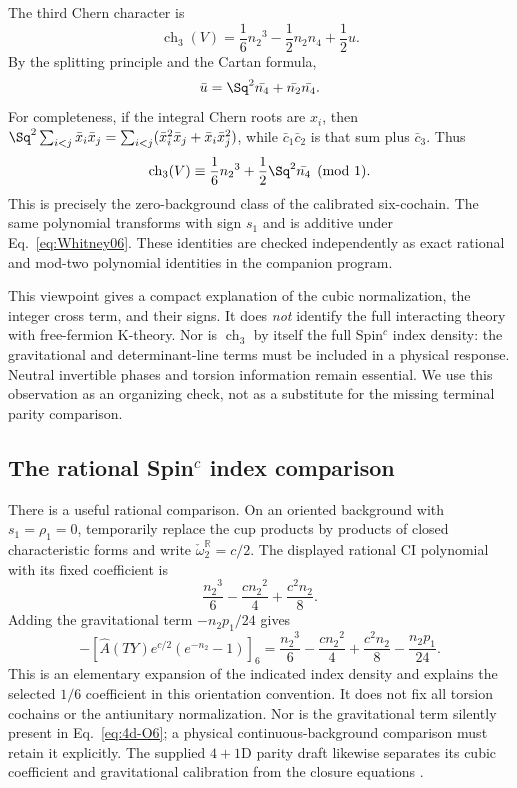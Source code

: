 The third Chern character is
\begin{equation}
               \operatorname{ch}_3(V)=\frac16{n_2}^3-\frac12{n_2}{n_4}+\frac12u.
\end{equation}
By the splitting principle and the Cartan formula,
\begin{equation}
                    \bar u=\Sq^2\bar {n_4}+\bar {n_2}\bar {n_4}.
\end{equation}
For completeness, if the integral Chern roots are $x_i$, then
$\Sq^2\sum_{i<j}\bar x_i\bar x_j=
\sum_{i<j}(\bar x_i^2\bar x_j+\bar x_i\bar x_j^2)$,
while $\bar c_1\bar c_2$ is that sum plus $\bar c_3$. Thus
\begin{equation}\label{eq:Newton06}
           \operatorname{ch}_3(V)
                  \equiv\frac16{n_2}^3+\frac12\Sq^2\bar {n_4}\pmod1.
\end{equation}
This is precisely the zero-background class of the calibrated six-cochain. The same polynomial transforms with sign ${s_1}$ and is additive under Eq.~\eqref{eq:Whitney06}. These identities are checked independently as exact rational and mod-two polynomial identities in the companion program.

This viewpoint gives a compact explanation of the cubic normalization, the integer cross term, and their signs. It does \emph{not} identify the full interacting theory with free-fermion K-theory. Nor is $\operatorname{ch}_3$ by itself the full Spin$^c$ index density: the gravitational and determinant-line terms must be included in a physical response. Neutral invertible phases and torsion information remain essential. We use this observation as an organizing check, not as a substitute for the missing terminal parity comparison.


\subsection{The rational Spin\texorpdfstring{$^c$}{c} index comparison}
There is a useful rational comparison. On an oriented background with ${s_1}={\rho_1}=0$, temporarily replace the cup products by products of closed characteristic forms and write $\check\omega_2^{\mathbb R}=c/2$. The displayed rational CI polynomial with its fixed coefficient is
\begin{equation}\label{eq:rational-index}
\frac{{n_2}^3}{6}-\frac{c {n_2}^2}{4}+\frac{c^2{n_2}}{8}.
\end{equation}
Adding the gravitational term $-{n_2} p_1/24$ gives
\begin{equation}
-\left[\widehat A(TY)e^{c/2}(e^{-{n_2}}-1)\right]_6
=\frac{{n_2}^3}{6}-\frac{c {n_2}^2}{4}+\frac{c^2{n_2}}{8}-\frac{{n_2} p_1}{24}.
\end{equation}
This is an elementary expansion of the indicated index density and explains the selected $1/6$ coefficient in this orientation convention. It does not fix all torsion cochains or the antiunitary normalization. Nor is the gravitational term silently present in Eq.~\eqref{eq:4d-O6}; a physical continuous-background comparison must retain it explicitly. The supplied $4+1$D parity draft likewise separates its cubic coefficient and gravitational calibration from the closure equations \cite{Project4}.
